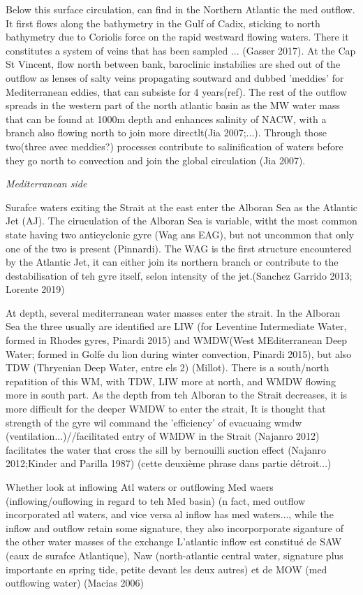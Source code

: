 Below this surface circulation, can find in the Northern Atlantic the med outflow. It first flows along the bathymetry in the Gulf of Cadix, sticking to north bathymetry due to Coriolis force on the rapid westward flowing waters. There it constitutes a system of veins that has been sampled ... (Gasser 2017). At the Cap St Vincent, flow north between bank,  baroclinic instabilies are shed out of the outflow as lenses of salty veins propagating soutward and dubbed 'meddies' for Mediterranean eddies, that can subsiste for 4 years(ref). The rest of the outflow spreads in the western part of the north atlantic basin as the MW water mass that can be found at 1000m depth and enhances salinity of NACW, with a branch also flowing north to join more directlt(Jia 2007;...). Through those two(three avec meddies?) processes contribute to salinification of waters before they go north to convection and join the global circulation (Jia 2007).

\textit{Mediterranean side}


Surafce waters exiting the Strait at the east enter the Alboran Sea as the Atlantic Jet (AJ). The ciruculation of the Alboran Sea is variable, witht the most common state having two anticyclonic gyre (Wag ans EAG), but not uncommon that only one of the two is present (Pinnardi). The WAG is the first structure encountered by the Atlantic Jet, it can either join its northern branch or contribute to the destabilisation of teh gyre itself, selon intensity of the jet.(Sanchez Garrido 2013; Lorente 2019) 

At depth, several mediterranean water masses enter the strait. In the Alboran Sea the three usually are identified are LIW (for Leventine Intermediate Water, formed in Rhodes gyres, Pinardi 2015) and WMDW(West MEditerranean Deep Water; formed in Golfe du lion during winter convection, Pinardi 2015), but also TDW (Thryenian Deep Water, entre els 2) (Millot). There is a south/north repatition of this WM, with TDW, LIW more at north, and WMDW flowing more in south part. As the depth from teh Alboran to the Strait decreases, it is more difficult for the deeper WMDW to enter the strait, It is thought that strength of the gyre wil command the 'efficiency' of evacuaing wmdw (ventilation...)//facilitated entry of WMDW in the Strait (Najanro 2012) facilitates the water that cross the sill by bernouilli suction effect (Najanro 2012;Kinder and Parilla 1987) (cette deuxième phrase dans partie détroit...) 


Whether look at inflowing Atl waters or outflowing Med waers (inflowing/ouflowing in regard to teh Med basin) (n fact, med outflow incorporated atl waters, and vice versa al inflow has med waters..., while the inflow and outflow retain some signature, they also incorporporate siganture of the other water masses of the exchange
L’atlantic inflow est constitué de SAW (eaux de surafce Atlantique), Naw (north-atlantic central water, signature plus importante en spring tide, petite devant les deux autres) et de MOW (med outflowing water) (Macias 2006)

